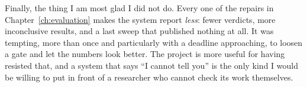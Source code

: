 Finally, the thing I am most glad I did not do. Every one of the repairs in
Chapter~\ref{ch:evaluation} makes the system report \emph{less}: fewer verdicts,
more inconclusive results, and a last sweep that published nothing at all. It was
tempting, more than once and particularly with a deadline approaching, to loosen a
gate and let the numbers look better. The project is more useful for having
resisted that, and a system that says ``I cannot tell you'' is the only kind I would
be willing to put in front of a researcher who cannot check its work themselves.

